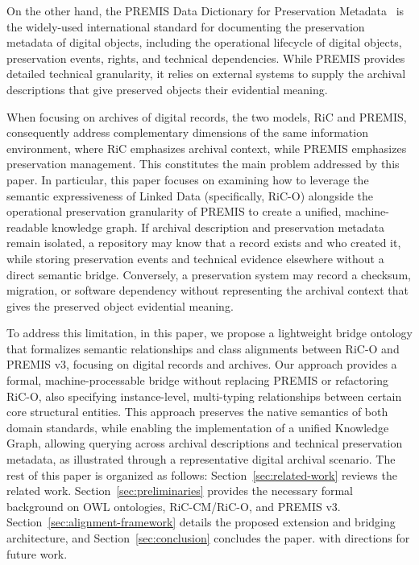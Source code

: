 \documentclass[runningheads]{llncs}
\begin{document}
On the other hand, the PREMIS Data Dictionary for Preservation Metadata~\cite{premis_data_dictionary_2015} is the widely-used international standard for documenting the preservation metadata of digital objects, including the operational lifecycle of digital objects, preservation events, rights, and technical dependencies. While PREMIS provides detailed technical granularity, it relies on external systems to supply the archival descriptions that give preserved objects their evidential meaning. 

When focusing on archives of digital records, the two models, RiC and PREMIS, consequently address complementary dimensions of the same information environment, where RiC emphasizes archival context, while PREMIS emphasizes preservation management. This constitutes the main problem addressed by this paper. In particular, this paper focuses on examining how to leverage the semantic expressiveness of Linked Data (specifically, RiC-O) alongside the operational preservation granularity of PREMIS to create a unified, machine-readable knowledge graph.  If archival description and preservation metadata remain isolated, a repository may know that a record exists and who created it, while storing preservation events and technical evidence elsewhere without a direct semantic bridge. Conversely, a preservation system may record a checksum, migration, or software dependency without representing the archival context that gives the preserved object evidential meaning.

To address this limitation, in this paper, we propose a lightweight bridge ontology that formalizes semantic relationships and class alignments between RiC-O and PREMIS v3, focusing on digital records and archives.  
Our approach provides a formal, machine-processable bridge without replacing PREMIS or refactoring RiC-O, also specifying  instance-level, multi-typing relationships between certain core structural entities. This approach preserves the native semantics of both domain standards, while enabling the implementation of a unified Knowledge Graph, allowing querying across archival descriptions and technical preservation metadata,
 as illustrated through a representative digital archival scenario.
The rest of this paper is organized as follows: Section~\ref{sec:related-work} reviews the related work. Section~\ref{sec:preliminaries} provides the necessary formal background on OWL ontologies, RiC-CM/RiC-O, and PREMIS v3. 
Section~\ref{sec:alignment-framework} details the proposed extension and bridging architecture,
and Section~\ref{sec:conclusion} concludes the paper.
 with directions for future work. 
\end{document}

